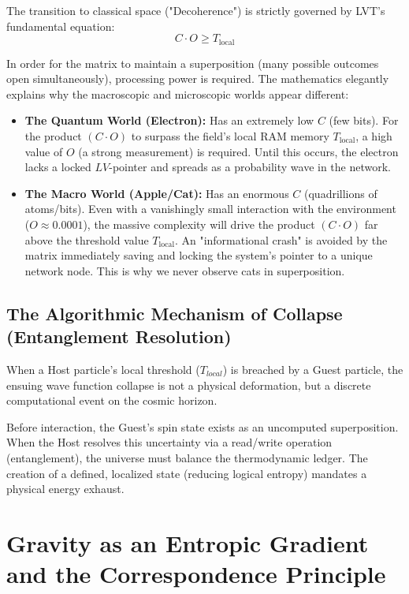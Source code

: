 \documentclass[12pt,a4paper]{article}
\begin{document}
The transition to classical space ("Decoherence") is strictly governed by LVT's fundamental equation:
\begin{equation}
\boxed{ C \cdot O \geq T_{\mathrm{local}} }
\end{equation}

In order for the matrix to maintain a superposition (many possible outcomes open simultaneously), processing power is required. The mathematics elegantly explains why the macroscopic and microscopic worlds appear different:
\begin{itemize}
    \item \textbf{The Quantum World (Electron):} Has an extremely low $C$ (few bits). For the product $(C \cdot O)$ to surpass the field's local RAM memory $T_{\mathrm{local}}$, a high value of $O$ (a strong measurement) is required. Until this occurs, the electron lacks a locked $LV$-pointer and spreads as a probability wave in the network.
    \item \textbf{The Macro World (Apple/Cat):} Has an enormous $C$ (quadrillions of atoms/bits). Even with a vanishingly small interaction with the environment ($O \approx 0.0001$), the massive complexity will drive the product $(C \cdot O)$ far above the threshold value $T_{\mathrm{local}}$. An "informational crash" is avoided by the matrix immediately saving and locking the system's pointer to a unique network node. This is why we never observe cats in superposition.
\end{itemize}

\subsection{The Algorithmic Mechanism of Collapse (Entanglement Resolution)}
When a Host particle's local threshold ($T_{local}$) is breached by a Guest particle, the ensuing wave function collapse is not a physical deformation, but a discrete computational event on the cosmic horizon. 

Before interaction, the Guest's spin state exists as an uncomputed superposition. When the Host resolves this uncertainty via a read/write operation (entanglement), the universe must balance the thermodynamic ledger. The creation of a defined, localized state (reducing logical entropy) mandates a physical energy exhaust.


\section{Gravity as an Entropic Gradient and the Correspondence Principle}
\end{document}
